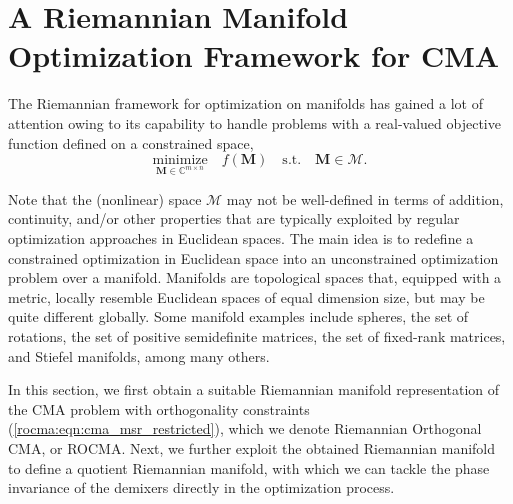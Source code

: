 \section{A Riemannian Manifold Optimization Framework for CMA} \label{rocma:RGD}

The Riemannian framework for optimization on manifolds \cite{Absil2008book} has gained a lot of attention owing to its capability to handle problems
with a real-valued objective function defined on a constrained space,
\begin{equation}
	\underset{\bm{M}\in\mathbb{C}^{m\times n}}{\text{minimize}}\quad f({\bm{M}})\quad\text{s.t.}\quad\bm{M}\in\mathcal{M}.
\end{equation} 

Note that the (nonlinear) space $\mathcal{M}$ may not be well-defined in terms of addition, continuity, and/or other properties that are typically exploited by regular 
optimization approaches in Euclidean spaces. 
The main idea is to redefine a constrained optimization in Euclidean space
into an unconstrained optimization problem over a manifold. 
Manifolds are topological spaces that, equipped with a metric, locally resemble 
Euclidean spaces of equal dimension size, but may be quite different globally.
Some manifold examples include spheres, the set of rotations, the set of positive semidefinite matrices, the set of fixed-rank matrices, and Stiefel manifolds, among many others. 

In this section, we first obtain a suitable Riemannian manifold representation of the CMA problem with orthogonality constraints (\ref{rocma:eqn:cma_msr_restricted}), which we denote Riemannian Orthogonal CMA, or ROCMA.
Next, we further exploit the obtained Riemannian manifold to define a 
quotient Riemannian manifold, with which we can
tackle the phase invariance of the demixers directly in the optimization process.

